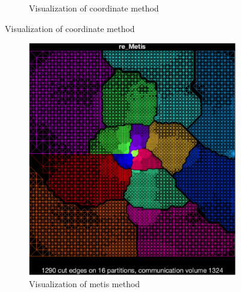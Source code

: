 \documentclass[unicode,11pt,a4paper,oneside,numbers=endperiod,openany]{scrartcl}
\begin{document}
\begin{figure}[htbp]
\begin{subfigure}[b]{0.3\textwidth}
        \caption{Visualization of coordinate method} 
    \end{subfigure}
    
\end{figure}
\begin{figure}[htbp]
    \centering
    
    \begin{subfigure}[b]{0.3\textwidth}
        \includegraphics[width=\textwidth]{images/metis.png}
        \caption{Visualization of metis method}
    \end{subfigure}
    \hfill
    \begin{subfigure}[b]{0.3\textwidth}

\end{subfigure}
\end{figure}
\end{document}
